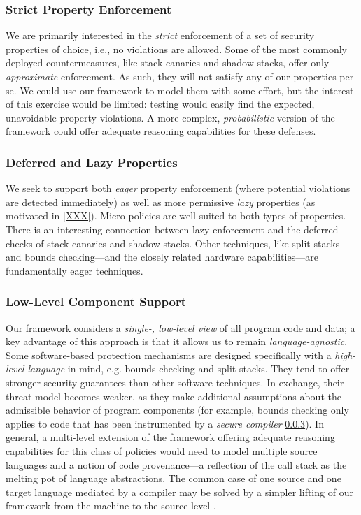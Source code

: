 \subsubsection{Strict Property Enforcement}
%
We are primarily interested in the \emph{strict} enforcement of a set of
security properties of choice, i.e., no violations are allowed. Some 
of the most commonly deployed countermeasures, like stack canaries and shadow
stacks, offer only \emph{approximate} enforcement. As such, they will not
satisfy any of our properties per se. We could use our framework to model them
with some effort, but the interest of this exercise would be limited: testing
would easily find the expected, unavoidable property violations. A more complex,
\emph{probabilistic} version of the framework could offer adequate reasoning
capabilities for these defenses.

\subsubsection{Deferred and Lazy Properties}
%
We seek to support both \emph{eager} property enforcement (where potential
violations are detected immediately) as well as more permissive \emph{lazy}
properties (as motivated in \cref{XXX}).
%
%
Micro-policies are well suited to both types of properties. There is an
interesting connection between lazy enforcement and the deferred checks of stack
canaries and shadow stacks. Other techniques, like split stacks and bounds
checking---and the closely related hardware capabilities---are fundamentally
eager techniques.

\subsubsection{Low-Level Component Support}
%
Our framework considers a \emph{single-, low-level view} of all program code and
data; a key advantage of this approach is that it allows us to remain
\emph{language-agnostic}.
%
Some software-based protection mechanisms are designed specifically with
a \emph{high-level language} in mind, e.g. bounds checking and split stacks.
They tend to offer stronger security guarantees than other software techniques.
In exchange, their threat model becomes weaker, as they make additional
assumptions about the admissible behavior of program components
%
(for example, bounds checking only applies to code that has been instrumented by
a \emph{secure compiler} \ref{}).
%
In general, a multi-level extension of the framework offering adequate reasoning
capabilities for this class of policies would need to model multiple source
languages and a notion of code provenance---a reflection of the call stack as the
melting pot of language abstractions.
%
The common case of one source and one target language mediated by a compiler may
be solved by a simpler lifting of our framework from the machine to the source
level .

